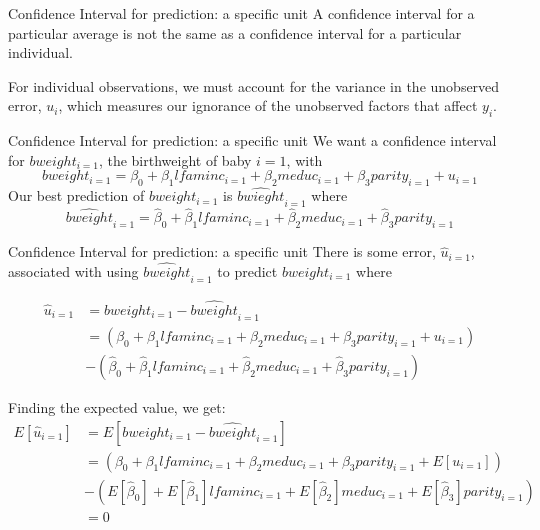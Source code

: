 \documentclass[
  ignorenonframetext,
]{beamer}
\begin{document}
\begin{frame}{Confidence Interval for prediction: a specific unit}
\protect\hypertarget{confidence-interval-for-prediction-a-specific-unit}{}
A confidence interval for a particular average is not the same as a
confidence interval for a particular individual.

For individual observations, we must account for the variance in the
unobserved error, \(u_i\), which measures our ignorance of the
unobserved factors that affect \(y_i\).
\end{frame}

\begin{frame}{Confidence Interval for prediction: a specific unit}
\protect\hypertarget{confidence-interval-for-prediction-a-specific-unit-1}{}
We want a confidence interval for \(bweight_{i=1}\), the birthweight of
baby \(i=1\), with \[
bweight_{i=1}=\beta_0+\beta_1lfaminc_{i=1}+\beta_2meduc_{i=1}+\beta_3parity_{i=1}+u_{i=1}
\] Our best prediction of \(bweight_{i=1}\) is
\(\widehat{bwieght}_{i=1}\) where \[
\widehat{bweight}_{i=1}=\hat{\beta}_0+\hat{\beta}_1lfaminc_{i=1}+\hat{\beta}_2meduc_{i=1}+\hat{\beta}_3parity_{i=1}
\]
\end{frame}

\begin{frame}{Confidence Interval for prediction: a specific unit}
\protect\hypertarget{confidence-interval-for-prediction-a-specific-unit-2}{}
There is some error, \(\hat{u}_{i=1}\), associated with using
\(\widehat{bweight}_{i=1}\) to predict \(bweight_{i=1}\) where

\[
\begin{aligned}
\hat{u}_{i=1}&=bweight_{i=1}-\widehat{bweight}_{i=1}\\
&=(\beta_0+\beta_1lfaminc_{i=1}+\beta_2meduc_{i=1}+\beta_3parity_{i=1}+u_{i=1})\\
&-(\hat{\beta}_0+\hat{\beta}_1lfaminc_{i=1}+\hat{\beta}_2meduc_{i=1}+\hat{\beta}_3parity_{i=1})
\end{aligned}
\]

Finding the expected value, we get: \footnotesize \[
\begin{aligned}
E[\hat{u}_{i=1}]&=E[bweight_{i=1}-\widehat{bweight}_{i=1}]\\
&=(\beta_0+\beta_1lfaminc_{i=1}+\beta_2meduc_{i=1}+\beta_3parity_{i=1}+E[u_{i=1}])\\
&-(E[\hat{\beta}_0]+E[\hat{\beta}_1]lfaminc_{i=1}+E[\hat{\beta}_2]meduc_{i=1}+E[\hat{\beta}_3]parity_{i=1})\\
&=0
\end{aligned}
\]
\end{frame}
\end{document}
